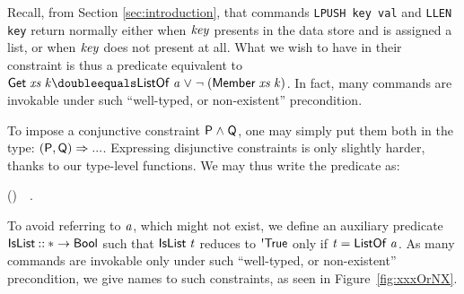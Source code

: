 Recall, from Section \ref{sec:introduction}, that commands \texttt{LPUSH key
val} and \texttt{LLEN key} return normally either when \ensuremath{\Varid{key}} presents in the
data store and is assigned a list, or when \ensuremath{\Varid{key}} does not present at all.
What we wish to have in their constraint is thus a predicate equivalent to \ensuremath{\Conid{Get}\;\Varid{xs}\;\Varid{k}\doubleequals\Conid{ListOf}\;\Varid{a}\mathrel{\vee}\neg \;(\Conid{Member}\;\Varid{xs}\;\Varid{k})}. In fact, many \Redis{} commands
are invokable under such ``well-typed, or non-existent'' precondition.

To impose a conjunctive constraint \ensuremath{\Conid{P}\mathrel{\wedge}\Conid{Q}}, one may simply put them both in the
type: \ensuremath{(\Conid{P},\Conid{Q})\Rightarrow \mathbin{...}}. Expressing disjunctive constraints is only slightly
harder, thanks to our type-level functions. We may thus write the predicate as:
\begin{hscode}\SaveRestoreHook
{}%
%
\>[B]{}\;\;\mathrel{\sim}\;\;(\;\;)~~.{}\<[E]%
\ColumnHook
\end{hscode}\resethooks
To avoid referring to \ensuremath{\Varid{a}}, which might not exist, we define an auxiliary predicate \ensuremath{\Conid{IsList}\mathbin{::}\mathbin{*}\to \Conid{Bool}} such that \ensuremath{\Conid{IsList}\;\Varid{t}} reduces to \ensuremath{\mbox{\textquotesingle}\Conid{True}}
only if \ensuremath{\Varid{t}\mathrel{=}\Conid{ListOf}\;\Varid{a}}. As many \Redis{} commands are invokable only under such
``well-typed, or non-existent'' precondition, we give names to such constraints,
as seen in Figure~\ref{fig:xxxOrNX}.

